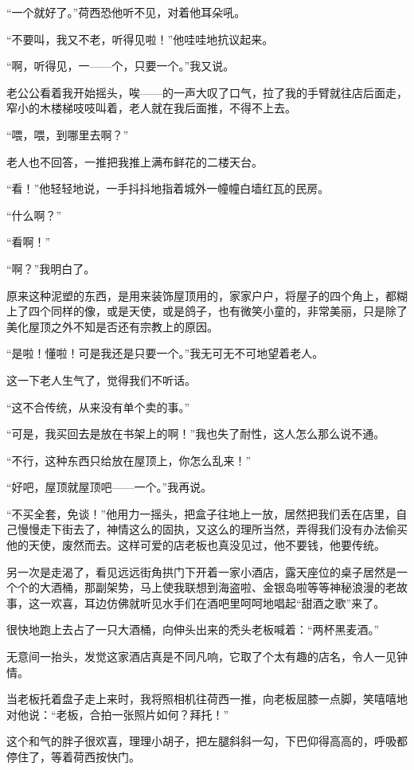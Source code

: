 \par “一个就好了。”荷西恐他听不见，对着他耳朵吼。
\par “不要叫，我又不老，听得见啦！”他哇哇地抗议起来。
\par “啊，听得见，一——个，只要一个。”我又说。
\par 老公公看着我开始摇头，唉——的一声大叹了口气，拉了我的手臂就往店后面走，窄小的木楼梯吱吱叫着，老人就在我后面推，不得不上去。
\par “喂，喂，到哪里去啊？”
\par 老人也不回答，一推把我推上满布鲜花的二楼天台。
\par “看！”他轻轻地说，一手抖抖地指着城外一幢幢白墙红瓦的民房。
\par “什么啊？”
\par “看啊！”
\par “啊？”我明白了。
\par 原来这种泥塑的东西，是用来装饰屋顶用的，家家户户，将屋子的四个角上，都糊上了四个同样的像，或是天使，或是鸽子，也有微笑小童的，非常美丽，只是除了美化屋顶之外不知是否还有宗教上的原因。
\par “是啦！懂啦！可是我还是只要一个。”我无可无不可地望着老人。
\par 这一下老人生气了，觉得我们不听话。
\par “这不合传统，从来没有单个卖的事。”
\par “可是，我买回去是放在书架上的啊！”我也失了耐性，这人怎么那么说不通。
\par “不行，这种东西只给放在屋顶上，你怎么乱来！”
\par “好吧，屋顶就屋顶吧——一个。”我再说。
\par “不买全套，免谈！”他用力一摇头，把盒子往地上一放，居然把我们丢在店里，自己慢慢走下街去了，神情这么的固执，又这么的理所当然，弄得我们没有办法偷买他的天使，废然而去。这样可爱的店老板也真没见过，他不要钱，他要传统。
\par 另一次是走渴了，看见远远街角拱门下开着一家小酒店，露天座位的桌子居然是一个个的大酒桶，那副架势，马上使我联想到海盗啦、金银岛啦等等神秘浪漫的老故事，这一欢喜，耳边仿佛就听见水手们在酒吧里呵呵地唱起“甜酒之歌”来了。
\par 很快地跑上去占了一只大酒桶，向伸头出来的秃头老板喊着：“两杯黑麦酒。”
\par 无意间一抬头，发觉这家酒店真是不同凡响，它取了个太有趣的店名，令人一见钟情。
\par 当老板托着盘子走上来时，我将照相机往荷西一推，向老板屈膝一点脚，笑嘻嘻地对他说：“老板，合拍一张照片如何？拜托！”
\par 这个和气的胖子很欢喜，理理小胡子，把左腿斜斜一勾，下巴仰得高高的，呼吸都停住了，等着荷西按快门。
